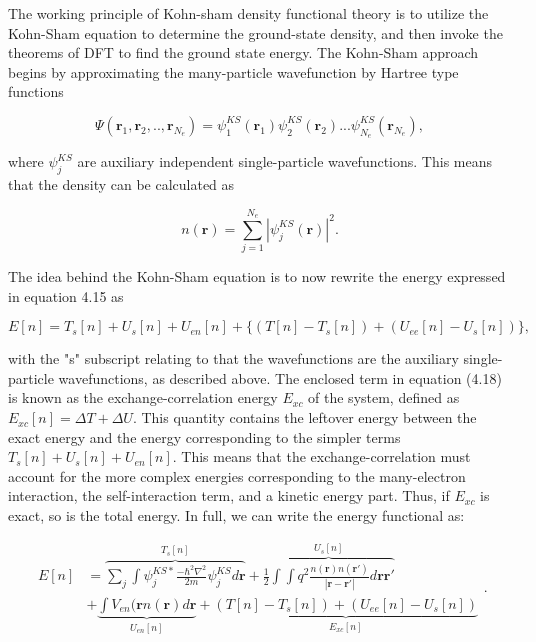 The working principle of Kohn-sham density functional theory is to utilize the Kohn-Sham equation to determine the ground-state density, and then invoke the theorems of DFT to find the ground state energy. The Kohn-Sham approach begins by approximating the many-particle wavefunction by Hartree type functions

\begin{equation}
    \Psi(\boldsymbol{r}_1, \boldsymbol{r}_2 , .., \boldsymbol{r}_{N_e}) = \psi_1^{KS}(\boldsymbol{r}_1)\psi_2^{KS}(\boldsymbol{r}_2)...\psi_{N_e}^{KS}(\boldsymbol{r}_{N_e}), 
\end{equation}

where $\psi_j^{KS}$ are auxiliary independent single-particle wavefunctions. This means that the density can be calculated as

\begin{equation}
n(\boldsymbol{r}) = \sum_{j=1}^{N_e} |\psi_{j}^{KS}(\boldsymbol{r})|^2.
\end{equation} 

The idea behind the Kohn-Sham equation is to now rewrite the energy expressed in equation 4.15 as

\begin{equation}
    E[n] = T_s[n] + U_s[n] + U_{en}[n] + \bigg\{(T[n] - T_s[n]) + (U_{ee}[n] - U_s[n]) \bigg\}, 
\end{equation}

with the "s" subscript relating to that the wavefunctions are the auxiliary single-particle wavefunctions, as described above. The enclosed term in equation (4.18) is known as the exchange-correlation energy $E_{xc}$ of the system, defined as $E_{xc}[n] = \Delta T + \Delta U$. This quantity contains the leftover energy between the exact energy and the energy corresponding to the simpler terms $T_s[n] + U_s[n] + U_{en}[n]$. This means that the exchange-correlation must account for the more complex energies corresponding to the many-electron interaction, the self-interaction term, and a kinetic energy part. Thus, if $E_{xc}$ is exact, so is the total energy. In full, we can write the energy functional as: 

\begin{equation}
    \begin{split}
    E[n] &= \overbrace{\sum_j \int \psi_j^{KS*}\frac{-\hbar^2 \nabla^2}{2m}\psi_j^{KS}d\boldsymbol{r}}^{T_s[n]} + \overbrace{\frac{1}{2} \int \int q^2 \frac{n(\boldsymbol{r})n(\boldsymbol{r}')}{|\boldsymbol{r} - \boldsymbol{r}'|}d\boldsymbol{r}\boldsymbol{r}'}^{U_s[n]} \\ 
        &+ \underbrace{\int V_{en}(\boldsymbol{r}n(\boldsymbol{r})d\boldsymbol{r}}_{U_{en}[n]} + \underbrace{(T[n] - T_s[n]) + (U_{ee}[n] - U_s[n])}_{E_{xc}[n]}
    \end{split}.
\end{equation}


